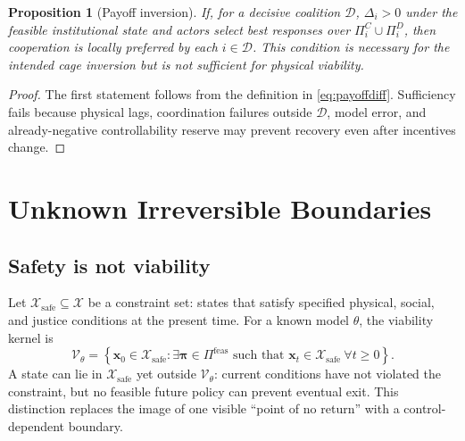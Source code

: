 \documentclass[11pt,a4paper]{article}
\numberwithin{equation}{section}
\theoremstyle{definition}
\theoremstyle{plain}
\newtheorem{proposition}[definition]{Proposition}
\theoremstyle{remark}
\newcommand{\safe}{\mathcal{X}_{\mathrm{safe}}}
\newcommand{\policy}{\boldsymbol{\pi}}
\newcommand{\state}{\bm{x}}
\begin{document}
\begin{proposition}[Payoff inversion]
If, for a decisive coalition $\mathcal D$, $\Delta_i>0$ under the feasible institutional state and actors select best responses over $\Pi_i^C\cup\Pi_i^D$, then cooperation is locally preferred by each $i\in\mathcal D$. This condition is necessary for the intended cage inversion but is not sufficient for physical viability.
\end{proposition}

\begin{proof}
The first statement follows from the definition in \cref{eq:payoffdiff}. Sufficiency fails because physical lags, coordination failures outside $\mathcal D$, model error, and already-negative controllability reserve may prevent recovery even after incentives change.
\end{proof}

\section{Unknown Irreversible Boundaries}

\subsection{Safety is not viability}

Let $\safe\subseteq\mathcal X$ be a constraint set: states that satisfy specified physical, social, and justice conditions at the present time. For a known model $\theta$, the viability kernel is
\begin{equation}
\mathcal V_{\theta}=
\left\{
\state_0\in\safe:
\exists\policy\in\Pi^{\mathrm{feas}}
\text{ such that }
\state_t\in\safe\ \forall t\ge0
\right\}.
\label{eq:viability}
\end{equation}
A state can lie in $\safe$ yet outside $\mathcal V_{\theta}$: current conditions have not violated the constraint, but no feasible future policy can prevent eventual exit. This distinction replaces the image of one visible ``point of no return'' with a control-dependent boundary.
\end{document}

